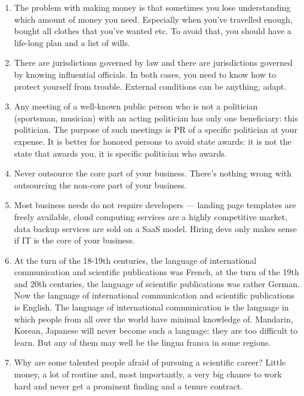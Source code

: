 \documentclass[11pt]{article}
\theoremstyle{remark}
\theoremstyle{definition}
\begin{document}
\begin{enumerate}
\item The problem with making money is that sometimes you lose understanding which amount of money you need. Especially when you've travelled enough, bought all clothes that you've wanted etc. To avoid that, you should have a life-long plan and a list of wills. 

\item There are jurisdictions governed by law and there are jurisdictions governed by knowing influential officials. In both cases, you need to know how to protect yourself from trouble. External conditions can be anything; adapt.



\item Any meeting of a well-known public person who is not a politician (sportsman, musician) with an acting politician has only one beneficiary: this politician. The purpose of such meetings is PR of a specific politician at your expense. It is better for honored persons to avoid state awards: it is not the state that awards you, it is specific politician who awards.


\item Never outsource the core part of your business. There's nothing wrong with outsourcing the non-core part of your business.

\item Most business needs do not require developers --- landing page templates are freely available, cloud computing services are a highly competitive market, data backup services are sold on a SaaS model. Hiring devs only makes sense if IT is the core of your business.




\item At the turn of the 18-19th centuries, the language of international communication and scientific publications was French, at the turn of the 19th and 20th centuries, the language of scientific publications was rather German. Now the language of international communication and scientific publications is English. The language of international communication is the language in which people from all over the world have minimal knowledge of. Mandarin, Korean, Japanese will never become such a language: they are too difficult to learn. But any of them may well be the lingua franca in some regions.



\item Why are some talented people afraid of pursuing a scientific career? Little money, a lot of routine and, most importantly, a very big chance to work hard and never get a prominent finding and a tenure contract.



\end{enumerate}
\end{document}
